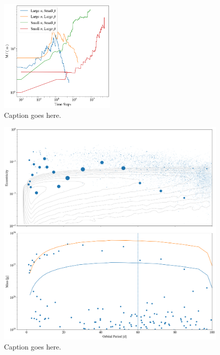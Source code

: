 \documentclass[twocolumn]{aastex63}
\begin{document}
\begin{figure}
\begin{center}
    \includegraphics[width=0.5\textwidth]{figures/alpha_beta_evo.png}
    \caption{Caption goes here.\label{fig:alpha_beta_evo}}
\end{center}
\end{figure}


\begin{figure}
\begin{center}
    \includegraphics[width=\textwidth]{figures/fulldisk_e_m.png}
    \caption{Caption goes here.\label{fig:fulldisk_e_m}}
\end{center}
\end{figure}
\end{document}
